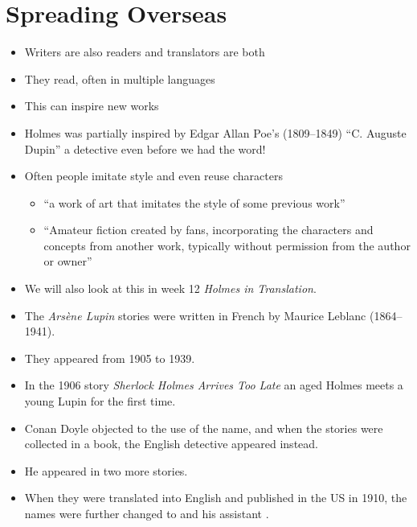 \documentclass[a4paper,landscape,headrule,footrule,xetex]{foils}
\begin{document}





\section{Spreading Overseas }


\begin{itemize}
\item Writers are also readers and translators are both
\item They read, often in multiple languages
\item This can inspire new works
\item Holmes was partially inspired by Edgar Allan Poe's (1809–1849)
  ``C. Auguste Dupin'' a detective even before we had the word!
\item Often people imitate style and even reuse characters
  \begin{itemize}
  \item  {} ``a work of art that imitates the style of some previous work''
  \item {} ``Amateur fiction created by fans, incorporating
    the characters and concepts from another work, typically without permission from the author or owner''
  \end{itemize}
\item We will also look at this in week 12 \textit{Holmes in Translation}.
\end{itemize}


\begin{itemize}
\item The \textit{Arsène Lupin} stories were written in French by
  Maurice Leblanc (1864–1941).
\item They appeared from 1905 to 1939.
\item In the 1906 story \textit{Sherlock Holmes Arrives Too Late} an
  aged Holmes meets a young Lupin for the first time.
\item Conan Doyle objected to the use of the name, and when the
  stories were collected in a book, the English detective  appeared instead.
\item He appeared in two more stories.
\item When they were translated into English and published in the US
  in 1910, the names were further changed to 
  and his assistant .

\end{itemize}
\end{document}
